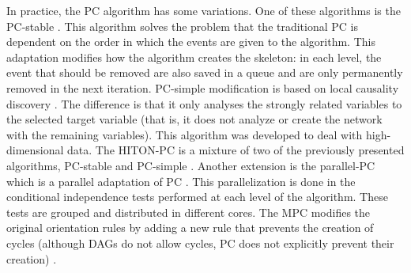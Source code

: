 In practice, the PC algorithm has some variations. One of these algorithms is the PC-stable \cite{colombo2014order}. This algorithm solves the problem that the traditional PC is dependent on the order in which the events are given to the algorithm. This adaptation modifies how the algorithm creates the skeleton: in each level, the event that should be removed are also saved in a queue and are only permanently removed in the next iteration. PC-simple modification is based on local causality discovery \cite{buhlmann2010variable}. The difference is that it only analyses the strongly related variables to the selected target variable (that is, it does not analyze or create the network with the remaining variables). This algorithm was developed to deal with high-dimensional data. The HITON-PC is a mixture of two of the previously presented algorithms, PC-stable and PC-simple \cite{aliferis2003hiton}. Another extension is the parallel-PC which is a parallel adaptation of PC \cite{le2016fast}. This parallelization is done in the conditional independence tests performed at each level of the algorithm. These tests are grouped and distributed in different cores. The MPC modifies the original orientation rules by adding a new rule that prevents the creation of cycles (although DAGs do not allow cycles, PC does not explicitly prevent their creation) \cite{tsagris2019bayesian}.
